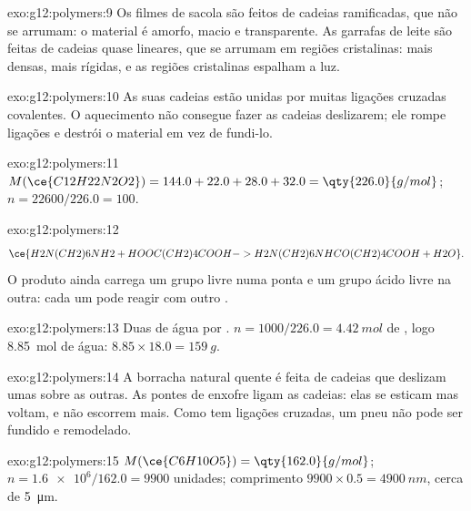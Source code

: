 \begin{solution}{exo:g12:polymers:9}
Os filmes de sacola são feitos de cadeias ramificadas, que não se
arrumam: o material é amorfo, macio e transparente. As garrafas de leite
são feitas de cadeias quase lineares, que se arrumam em regiões
cristalinas: mais densas, mais rígidas, e as regiões cristalinas
espalham a luz.
\end{solution}

\begin{solution}{exo:g12:polymers:10}
As suas cadeias estão unidas por muitas ligações cruzadas covalentes. O
aquecimento não consegue fazer as cadeias deslizarem; ele rompe ligações
e destrói o material em vez de fundi-lo.
\end{solution}

\begin{solution}{exo:g12:polymers:11}
$M(\ce{C12H22N2O2}) = 144.0 + 22.0 + 28.0 + 32.0 = \qty{226.0}{g/mol}$;
$n = 22600/226.0 = 100$.
\end{solution}

\begin{solution}{exo:g12:polymers:12}
\[
  \ce{H2N(CH2)6NH2 + HOOC(CH2)4COOH -> H2N(CH2)6NHCO(CH2)4COOH + H2O} .
\]
O produto ainda carrega um grupo  livre numa ponta e um grupo
ácido livre na outra: cada um pode reagir com outro .
\end{solution}

\begin{solution}{exo:g12:polymers:13}
Duas  de água por . $n = 1000/226.0 =
\qty{4.42}{mol}$ de , logo \qty{8.85}{mol} de água:
$8.85 \times 18.0 = \qty{159}{g}$.
\end{solution}

\begin{solution}{exo:g12:polymers:14}
A borracha natural quente é feita de cadeias que deslizam umas sobre as
outras. As pontes de enxofre ligam as cadeias: elas se esticam mas
voltam, e não escorrem mais. Como tem ligações cruzadas, um pneu não
pode ser fundido e remodelado.
\end{solution}

\begin{solution}{exo:g12:polymers:15}
$M(\ce{C6H10O5}) = \qty{162.0}{g/mol}$; $n = \num{1.6e6}/162.0 = 9900$
unidades; comprimento $9900 \times 0.5 = \qty{4900}{nm}$, cerca de
\qty{5}{\micro m}.
\end{solution}


